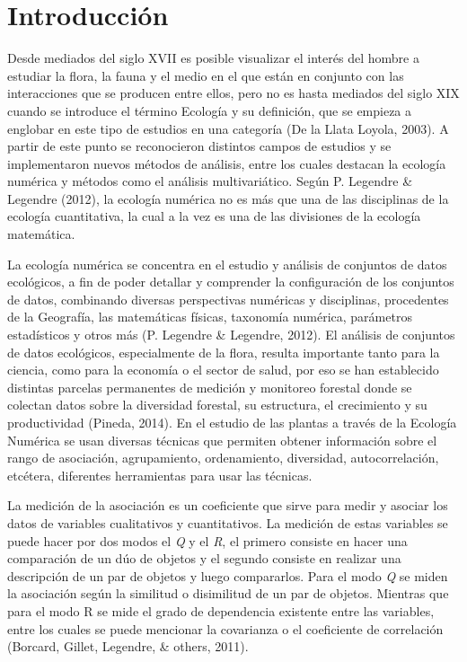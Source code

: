\documentclass[11pt,]{article}
\begin{document}
\vskip 6.5pt


\noindent  \section{Introducción}\label{introducciuxf3n}

Desde mediados del siglo XVII es posible visualizar el interés del
hombre a estudiar la flora, la fauna y el medio en el que están en
conjunto con las interacciones que se producen entre ellos, pero no es
hasta mediados del siglo XIX cuando se introduce el término Ecología y
su definición, que se empieza a englobar en este tipo de estudios en una
categoría (De la Llata Loyola, 2003). A partir de este punto se
reconocieron distintos campos de estudios y se implementaron nuevos
métodos de análisis, entre los cuales destacan la ecología numérica y
métodos como el análisis multivariático. Según P. Legendre \& Legendre
(2012), la ecología numérica no es más que una de las disciplinas de la
ecología cuantitativa, la cual a la vez es una de las divisiones de la
ecología matemática.

La ecología numérica se concentra en el estudio y análisis de conjuntos
de datos ecológicos, a fin de poder detallar y comprender la
configuración de los conjuntos de datos, combinando diversas
perspectivas numéricas y disciplinas, procedentes de la Geografía, las
matemáticas físicas, taxonomía numérica, parámetros estadísticos y otros
más (P. Legendre \& Legendre, 2012). El análisis de conjuntos de datos
ecológicos, especialmente de la flora, resulta importante tanto para la
ciencia, como para la economía o el sector de salud, por eso se han
establecido distintas parcelas permanentes de medición y monitoreo
forestal donde se colectan datos sobre la diversidad forestal, su
estructura, el crecimiento y su productividad (Pineda, 2014). En el
estudio de las plantas a través de la Ecología Numérica se usan diversas
técnicas que permiten obtener información sobre el rango de asociación,
agrupamiento, ordenamiento, diversidad, autocorrelación, etcétera,
diferentes herramientas para usar las técnicas.

La medición de la asociación es un coeficiente que sirve para medir y
asociar los datos de variables cualitativos y cuantitativos. La medición
de estas variables se puede hacer por dos modos el \emph{Q} y el
\emph{R}, el primero consiste en hacer una comparación de un dúo de
objetos y el segundo consiste en realizar una descripción de un par de
objetos y luego compararlos. Para el modo \emph{Q} se miden la
asociación según la similitud o disimilitud de un par de objetos.
Mientras que para el modo R se mide el grado de dependencia existente
entre las variables, entre los cuales se puede mencionar la covarianza o
el coeficiente de correlación (Borcard, Gillet, Legendre, \& others,
2011).
\end{document}
